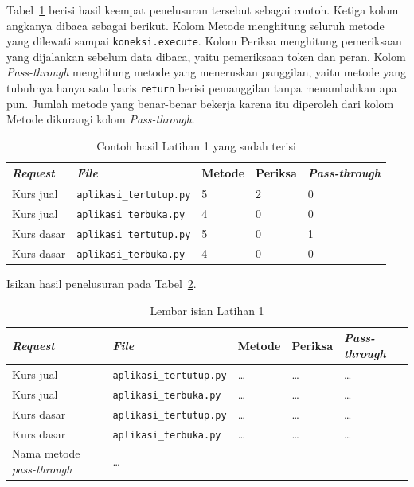 Tabel~\ref{tab:lat1-contoh} berisi hasil keempat penelusuran tersebut sebagai
contoh. Ketiga kolom angkanya dibaca sebagai berikut. Kolom Metode menghitung
seluruh metode yang dilewati sampai \texttt{koneksi.execute}. Kolom Periksa
menghitung pemeriksaan yang dijalankan sebelum data dibaca, yaitu pemeriksaan
token dan peran. Kolom \textit{Pass-through} menghitung metode yang meneruskan panggilan,
yaitu metode yang tubuhnya hanya satu baris \texttt{return} berisi pemanggilan
tanpa menambahkan apa pun. Jumlah metode yang benar-benar bekerja karena itu
diperoleh dari kolom Metode dikurangi kolom \textit{Pass-through}.

\begin{table}[htbp]
  \centering
  \caption{Contoh hasil Latihan 1 yang sudah terisi}
  \label{tab:lat1-contoh}
  \begin{tabularx}{\textwidth}{|l|X|l|l|l|}
    \hline
    \textbf{\textit{Request}} & \textbf{\textit{File}} & \textbf{Metode} & \textbf{Periksa} & \textbf{\textit{Pass-through}} \\
    \hline
    Kurs jual & \texttt{aplikasi\_tertutup.py} & 5 & 2 & 0 \\
    \hline
    Kurs jual & \texttt{aplikasi\_terbuka.py} & 4 & 0 & 0 \\
    \hline
    Kurs dasar & \texttt{aplikasi\_tertutup.py} & 5 & 0 & 1 \\
    \hline
    Kurs dasar & \texttt{aplikasi\_terbuka.py} & 4 & 0 & 0 \\
    \hline
  \end{tabularx}
\end{table}

Isikan hasil penelusuran pada Tabel~\ref{tab:lat1-hasil}.

\begin{table}[htbp]
  \centering
  \caption{Lembar isian Latihan 1}
  \label{tab:lat1-hasil}
  \begin{tabularx}{\textwidth}{|l|X|l|l|l|}
    \hline
    \textbf{\textit{Request}} & \textbf{\textit{File}} & \textbf{Metode} & \textbf{Periksa} & \textbf{\textit{Pass-through}} \\
    \hline
    Kurs jual & \texttt{aplikasi\_tertutup.py} & \dots & \dots & \dots \\
    \hline
    Kurs jual & \texttt{aplikasi\_terbuka.py} & \dots & \dots & \dots \\
    \hline
    Kurs dasar & \texttt{aplikasi\_tertutup.py} & \dots & \dots & \dots \\
    \hline
    Kurs dasar & \texttt{aplikasi\_terbuka.py} & \dots & \dots & \dots \\
    \hline
    Nama metode \textit{pass-through} & \multicolumn{4}{l|}{\dots} \\
    \hline
  \end{tabularx}
\end{table}

